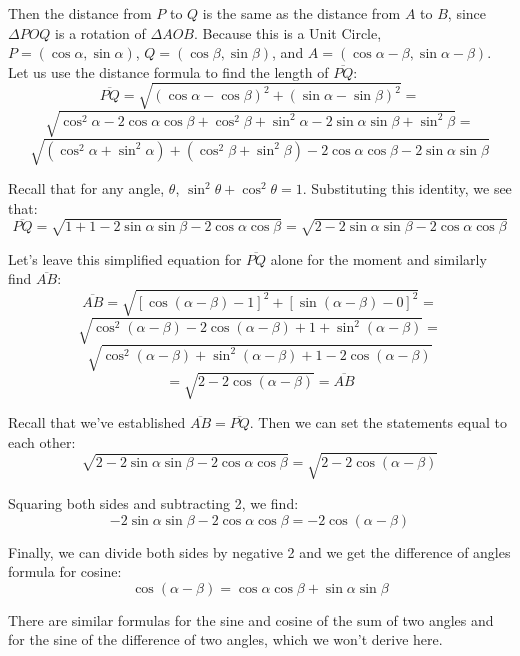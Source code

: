 Then the distance from $P$ to $Q$ is the same as the distance from $A$ to $B$, 
since $\Delta POQ$ is a rotation of $\Delta AOB$. Because this is a Unit 
Circle, $P = (\cos{\alpha}, \sin{\alpha})$, $Q = (\cos{\beta}, \sin{\beta})$, 
and $A = (\cos{\alpha - \beta}, \sin{\alpha - \beta})$. Let us use the distance
formula to find the length of $\overline{PQ}$:
$$\overline{PQ} = \sqrt{\left(\cos{\alpha} - \cos{\beta} \right)^2 + \left( 
\sin{\alpha} - \sin{\beta} \right)^2} =$$
$$\sqrt{\cos^2{\alpha} - 2\cos{\alpha}\cos{\beta} + \cos^2{\beta} + \sin^2{
\alpha} - 2\sin{\alpha}\sin{\beta} + \sin^2{\beta}} = $$
$$\sqrt{\left( \cos^2{\alpha} + \sin^2{\alpha} \right) + \left( \cos^2{\beta} 
+ \sin^2{\beta} \right) - 2\cos{\alpha}\cos{\beta} - 2\sin{\alpha}\sin{\beta}}
$$

Recall that for any angle, $\theta$, $\sin^2{\theta} + \cos^2{\theta} = 1$. 
Substituting this identity, we see that:
$$\overline{PQ} = \sqrt{1 + 1 -2\sin{\alpha}\sin{\beta} - 2\cos{\alpha}\cos{
\beta}} = \sqrt{2 - 2\sin{\alpha}\sin{\beta} - 2\cos{\alpha}\cos{\beta}}$$

Let's leave this simplified equation for $\overline{PQ}$ alone for the moment 
and similarly find $\overline{AB}$:
$$\overline{AB} = \sqrt{\left[ \cos{\left( \alpha - \beta \right)} - 1 \right]^
2 + \left[ \sin{\left( \alpha - \beta \right)} - 0 \right]^2} = $$
$$\sqrt{\cos^2{ \left( \alpha - \beta \right)} - 2\cos{ \left( \alpha - \beta 
\right)} + 1 + \sin^2{ \left( \alpha - \beta \right)}} = $$
$$\sqrt{\cos^2{ \left( \alpha - \beta \right)} + \sin^2{ \left( \alpha - \beta 
\right)} + 1 - 2\cos{ \left( \alpha - \beta \right)}} $$
$$= \sqrt{2 - 2\cos{ \left( \alpha - \beta \right)}} = \overline{AB}$$

Recall that we've established $\overline{AB} = \overline{PQ}$. Then we can set 
the statements equal to each other:
$$ \sqrt{2 - 2\sin{\alpha}\sin{\beta} - 2\cos{\alpha}\cos{\beta}} = \sqrt{2 - 2
\cos{ \left( \alpha - \beta \right)}}$$

Squaring both sides and subtracting 2, we find:
$$-2\sin{\alpha}\sin{\beta} - 2\cos{\alpha}\cos{\beta} = -2\cos{\left( \alpha -
\beta \right)}$$

Finally, we can divide both sides by negative 2 and we get the difference of 
angles formula for cosine:
$$\cos{ \left( \alpha - \beta \right)} = \cos{\alpha}\cos{\beta} + \sin{\alpha}
\sin{\beta}$$

There are similar formulas for the sine and cosine of the sum of two angles and
for the sine of the difference of two angles, which we won't derive here. 

